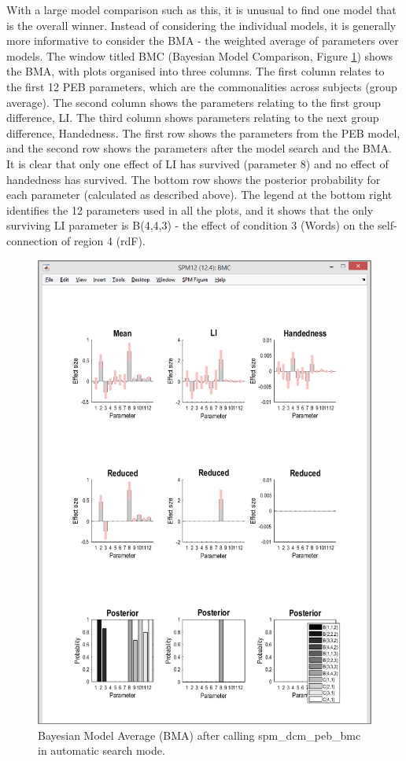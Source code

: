 \documentclass{article}
\begin{document}
With a large model comparison such as this, it is unusual to find one model that is the overall winner. Instead of considering the individual models, it is generally more informative to consider the BMA - the weighted average of parameters over models. The window titled BMC (Bayesian Model Comparison, Figure \ref{Fig_peb_search_part2}) shows the BMA, with plots organised into three columns. The first column relates to the first 12 PEB parameters, which are the commonalities across subjects (group average). The second column shows the parameters relating to the first group difference, LI. The third column shows parameters relating to the next group difference, Handedness. The first row shows the parameters from the PEB model, and the second row shows the parameters after the model search and the BMA. It is clear that only one effect of LI has survived (parameter 8) and no effect of handedness has survived. The bottom row shows the posterior probability for each parameter (calculated as described above). The legend at the bottom right identifies the 12 parameters used in all the plots, and it shows that the only surviving LI parameter is B(4,4,3) - the effect of condition 3 (Words) on the self-connection of region 4 (rdF).

\begin{figure}[ht]
\begin{center}
\includegraphics{"Fig_peb_search_part2"}
\caption{Bayesian Model Average (BMA) after calling spm\_dcm\_peb\_bmc in automatic search mode.\label{Fig_peb_search_part2}}
\end{center}
\end{figure}
\end{document}
